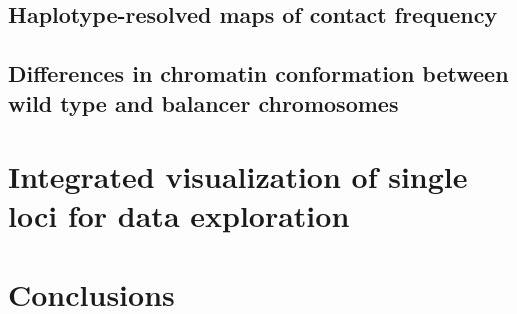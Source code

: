 \subsection{Haplotype-resolved maps of contact frequency}
\label{sec:balancer_cc_impl}

\subsection{Differences in chromatin conformation between wild type and balancer chromosomes}
\label{sec:balancer_cc_differences}



\section{Integrated visualization of single loci for data exploration}
\label{sec:balancer_visualization}


\section{Conclusions}
\label{sec:balancer_concl}
